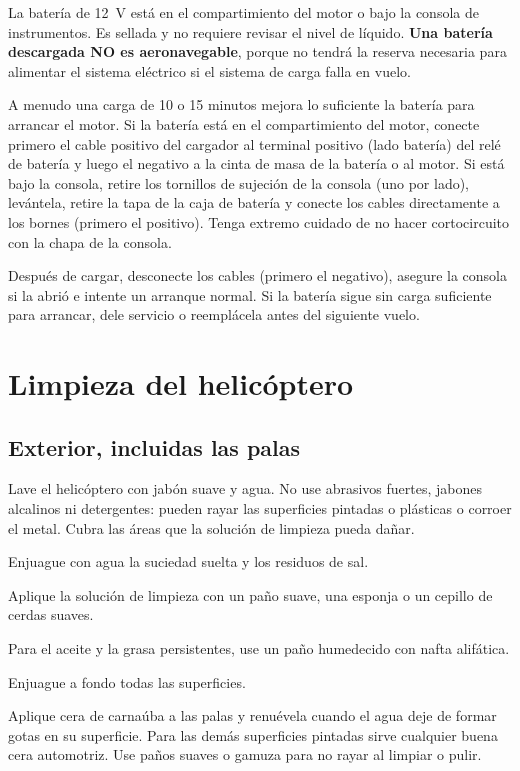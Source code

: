 La batería de 12~V está en el compartimiento del motor o bajo la consola de instrumentos. Es sellada y no requiere revisar el nivel de líquido. \textbf{Una batería descargada NO es aeronavegable}, porque no tendrá la reserva necesaria para alimentar el sistema eléctrico si el sistema de carga falla en vuelo.

A menudo una carga de 10 o 15 minutos mejora lo suficiente la batería para arrancar el motor. Si la batería está en el compartimiento del motor, conecte primero el cable positivo del cargador al terminal positivo (lado batería) del relé de batería y luego el negativo a la cinta de masa de la batería o al motor. Si está bajo la consola, retire los tornillos de sujeción de la consola (uno por lado), levántela, retire la tapa de la caja de batería y conecte los cables directamente a los bornes (primero el positivo). Tenga extremo cuidado de no hacer cortocircuito con la chapa de la consola.

Después de cargar, desconecte los cables (primero el negativo), asegure la consola si la abrió e intente un arranque normal. Si la batería sigue sin carga suficiente para arrancar, dele servicio o reemplácela antes del siguiente vuelo.

\section{Limpieza del helicóptero}

\subsection{Exterior, incluidas las palas}

Lave el helicóptero con jabón suave y agua. No use abrasivos fuertes, jabones alcalinos ni detergentes: pueden rayar las superficies pintadas o plásticas o corroer el metal. Cubra las áreas que la solución de limpieza pueda dañar.

\begin{pasos}
\item Enjuague con agua la suciedad suelta y los residuos de sal.
\item Aplique la solución de limpieza con un paño suave, una esponja o un cepillo de cerdas suaves.
\item Para el aceite y la grasa persistentes, use un paño humedecido con nafta alifática.
\item Enjuague a fondo todas las superficies.
\item Aplique cera de carnaúba a las palas y renuévela cuando el agua deje de formar gotas en su superficie. Para las demás superficies pintadas sirve cualquier buena cera automotriz. Use paños suaves o gamuza para no rayar al limpiar o pulir.
\end{pasos}

